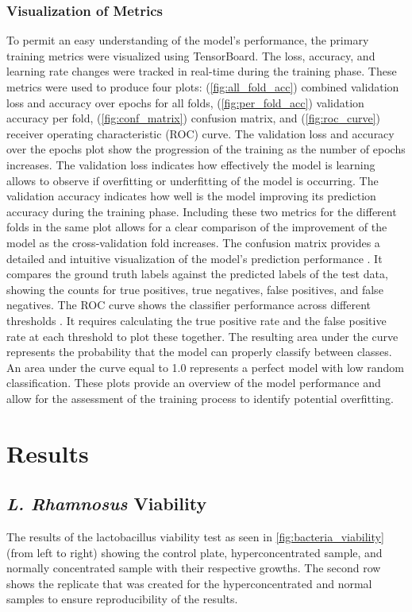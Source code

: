 \documentclass[final, 3p, 11pt]{elsarticle}
\begin{document}
\subsubsection{Visualization of Metrics}
To permit an easy understanding of the model’s performance, the primary training metrics were visualized using TensorBoard. The loss, accuracy, and learning rate changes were tracked in real-time during the training phase. These metrics were used to produce four plots: (\autoref{fig:all_fold_acc}) combined validation loss and accuracy over epochs for all folds, (\autoref{fig:per_fold_acc}) validation accuracy per fold, (\autoref{fig:conf_matrix}) confusion matrix, and (\autoref{fig:roc_curve}) receiver operating characteristic (ROC) curve. The validation loss and accuracy over the epochs plot show the progression of the training as the number of epochs increases. The validation loss indicates how effectively the model is learning allows to observe if overfitting or underfitting of the model is occurring. The validation accuracy indicates how well is the model improving its prediction accuracy during the training phase. Including these two metrics for the different folds in the same plot allows for a clear comparison of the improvement of the model as the cross-validation fold increases. The confusion matrix provides a detailed and intuitive visualization of the model’s prediction performance \citep{hernndezdeltoro_2022_assessing}. It compares the ground truth labels against the predicted labels of the test data, showing the counts for true positives, true negatives, false positives, and false negatives. The ROC curve shows the classifier performance across different thresholds \citep{googlefordevelopers_2024_classification}. It requires calculating the true positive rate and the false positive rate at each threshold to plot these together. The resulting area under the curve represents the probability that the model can properly classify between classes. An area under the curve equal to 1.0 represents a perfect model with low random classification. These plots provide an overview of the model performance and allow for the assessment of the training process to identify potential overfitting.

 
\section{Results}

\subsection{\textit{L. Rhamnosus} Viability}
The results of the lactobacillus viability test as seen in \autoref{fig:bacteria_viability} (from left to right) showing the control plate, hyperconcentrated sample, and normally concentrated sample with their respective growths. The second row shows the replicate that was created for the hyperconcentrated and normal samples to ensure reproducibility of the results.
\end{document}
